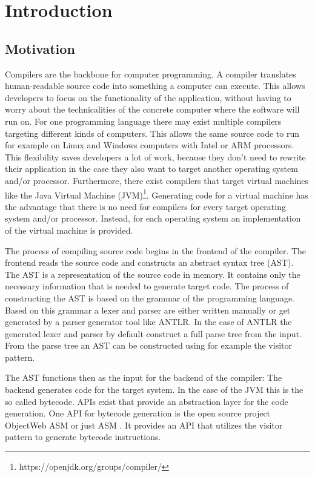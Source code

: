 \chapter{Introduction}
\label{cha:introduction}

\section{Motivation}

Compilers are the backbone for computer programming. A compiler translates human-readable source code into something a computer can execute. This allows developers to focus on the functionality of the application, without having to worry about the technicalities of the concrete computer where the software will run on. For one programming language there may exist multiple compilers targeting different kinds of computers. This allows the same source code to run for example on Linux and Windows computers with Intel or ARM processors. This flexibility saves developers a lot of work, because they don't need to rewrite their application in the case they also want to target another operating system and/or processor. Furthermore, there exist compilers that target virtual machines like the Java Virtual Machine (JVM)\footnote{https://openjdk.org/groups/compiler/}. Generating code for a virtual machine has the advantage that there is no need for compilers for every target operating system and/or processor. Instead, for each operating system an implementation of the virtual machine is provided.

The process of compiling source code begins in the frontend of the compiler. The frontend reads the source code and constructs an abstract syntax tree (AST). The AST is a representation of the source code in memory. It contains only the necessary information that is needed to generate target code. The process of constructing the AST is based on the grammar of the programming language. Based on this grammar a lexer and parser are either written manually or get generated by a parser generator tool like ANTLR. In the case of ANTLR the generated lexer and parser by default construct a full parse tree from the input. From the parse tree an AST can be constructed using for example the visitor pattern. 

The AST functions then as the input for the backend of the compiler: The backend generates code for the target system. In the case of the JVM this is the so called bytecode.  APIs exist that provide an abstraction layer for the code generation. One API for bytecode generation is the open source project ObjectWeb ASM or just ASM \parencite{bruneton2007asm}. It provides an API that utilizes the visitor pattern to generate bytecode instructions. 


